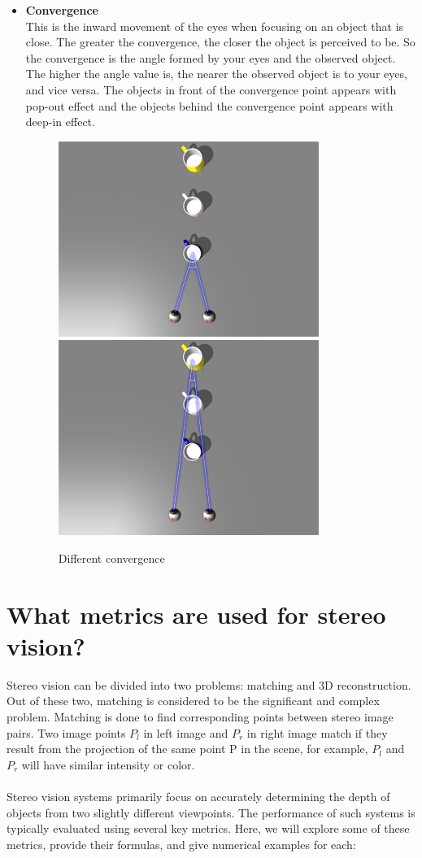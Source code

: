 \documentclass[22pt]{report}
\begin{document}
\begin{itemize}
            \item \textbf{Convergence}\\
                This is the inward movement of the eyes when focusing on an object that is close. The greater the convergence, the closer the object is perceived to be. So the convergence is the angle formed by your eyes and the observed object. The higher the angle value is, the nearer the observed object is to your eyes, and vice versa. The objects in front of the convergence point appears with pop-out effect and the objects behind the convergence point appears with deep-in effect.
                \begin{figure}[h]
                    \centering
                    \includegraphics[width=0.25\linewidth]{Images/Convergence1.jpg}
                    \includegraphics[width=0.25\linewidth]{Images/Convergence2.jpg}
                    \caption{Different convergence}
                    \label{fig:enter-label}
                \end{figure}
        \end{itemize}

        
        

\chapter{What metrics are used for stereo vision?}
    Stereo vision can be divided into two problems: matching and 3D reconstruction. Out of
    these two, matching is considered to be the significant and complex problem. Matching is done to find corresponding points between stereo image pairs. Two image points $P_l$ in left image and $P_r$ in right image match if they result from the projection of the same point P in the scene, for example, $P_l$ and $P_r$ will have similar intensity or color. \\\\
    Stereo vision systems primarily focus on accurately determining the depth of objects from two slightly different viewpoints. The performance of such systems is typically evaluated using several key metrics. Here, we will explore some of these metrics, provide their formulas, and give numerical examples for each:
    
\end{document}
